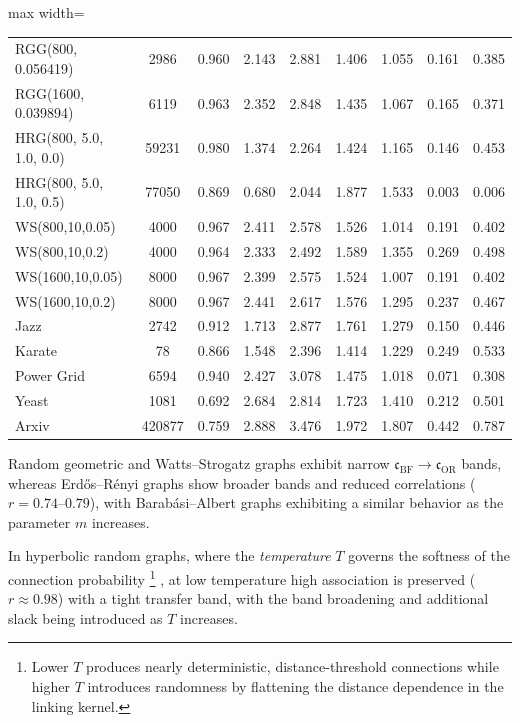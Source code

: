 \documentclass[twoside,11pt]{article}
\numberwithin{equation}{section}
\numberwithin{theorem}{section}
\numberwithin{example}{section}
\begin{document}
\begin{table}
\begin{adjustbox}{max width=\textwidth}
\begin{tabular}{l c c r r r r r r}
RGG(800, 0.056419) & 2986 & 0.960 & 2.143 & 2.881 & 1.406 & 1.055 & 0.161 & 0.385 \\
RGG(1600, 0.039894) & 6119 & 0.963 & 2.352 & 2.848 & 1.435 & 1.067 & 0.165 & 0.371 \\
HRG(800, 5.0, 1.0, 0.0) & 59231 & 0.980 & 1.374 & 2.264 & 1.424 & 1.165 & 0.146 & 0.453 \\
HRG(800, 5.0, 1.0, 0.5) & 77050 & 0.869 & 0.680 & 2.044 & 1.877 & 1.533 & 0.003 & 0.006 \\
WS(800,10,0.05) & 4000 & 0.967 & 2.411 & 2.578 & 1.526 & 1.014 & 0.191 & 0.402 \\
WS(800,10,0.2) & 4000 & 0.964 & 2.333 & 2.492 & 1.589 & 1.355 & 0.269 & 0.498 \\
WS(1600,10,0.05) & 8000 & 0.967 & 2.399 & 2.575 & 1.524 & 1.007 & 0.191 & 0.402 \\
WS(1600,10,0.2) & 8000 & 0.967 & 2.441 & 2.617 & 1.576 & 1.295 & 0.237 & 0.467 \\
Jazz & 2742 & 0.912 & 1.713 & 2.877 & 1.761 & 1.279 & 0.150 & 0.446 \\
Karate & 78 & 0.866 & 1.548 & 2.396 & 1.414 & 1.229 & 0.249 & 0.533 \\
Power Grid & 6594 & 0.940 & 2.427 & 3.078 & 1.475 & 1.018 & 0.071 & 0.308 \\
Yeast & 1081 & 0.692 & 2.684 & 2.814 & 1.723 & 1.410 & 0.212 & 0.501 \\
Arxiv & 420877 & 0.759 & 2.888 & 3.476 & 1.972 & 1.807 & 0.442 & 0.787 \\
\bottomrule
\end{tabular}
\end{adjustbox}
\end{table}

Random geometric and Watts--Strogatz graphs exhibit narrow  $\mathfrak{c}_{\mathrm{BF}} \to \mathfrak{c}_{\mathrm{OR}}$ bands, whereas Erd\H{o}s--R\'enyi graphs show broader bands and reduced correlations ($r = 0.74$--$0.79$), with Barab\'asi--Albert graphs exhibiting a similar behavior as the parameter $m$ increases.

In hyperbolic random graphs, where the \emph{temperature} $T$ governs the softness of the connection probability%
\footnote{Lower $T$ produces nearly deterministic, distance-threshold connections while higher $T$  introduces randomness by flattening the distance dependence in the linking kernel.}%
, at low temperature high association is preserved ($r \approx 0.98$) with a tight transfer band, with the band broadening and additional slack being introduced as $T$ increases. 
\end{document}
